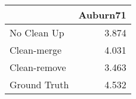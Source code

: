 \begin{tabular}{lr}
\toprule
{} & Auburn71 \\
\midrule
No Clean Up  &    3.874 \\
Clean-merge  &    4.031 \\
Clean-remove &    3.463 \\
Ground Truth &    4.532 \\
\bottomrule
\end{tabular}
